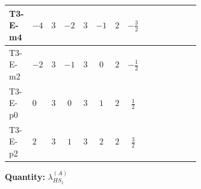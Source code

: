 \documentclass[8pt]{article}
\begin{document}
\begin{landscape}
\begin{longtable}{@{}llcccccc >{\raggedright\arraybackslash}p{0.21\linewidth} >{\raggedright\arraybackslash}p{0.21\linewidth} >{\raggedright\arraybackslash}p{0.21\linewidth}@{}}
\midrule
T3-E-m4 & $-4$ & $3$ & $-2$ & $3$ & $-1$ & $2$ & $-\frac{3}{2}$ & \scriptsize\adjustbox{max width=\linewidth}{$\begin{gathered} +2 {\lambda_1} {\lambda_{HS_1}^{(A)}}\end{gathered}$} & \scriptsize\adjustbox{max width=\linewidth}{$\begin{gathered} +8 {\lambda_{HS_1}^{(1)}} {\lambda_{HS_1}^{(A)}}\end{gathered}$} & \scriptsize\adjustbox{max width=\linewidth}{$\begin{gathered} +2 {\lambda_{HS_1}^{(A)}} {\lambda_{S_1}^{(1)}}\end{gathered}$} \\
\midrule
T3-E-m2 & $-2$ & $3$ & $-1$ & $3$ & $0$ & $2$ & $-\frac{1}{2}$ & \scriptsize\adjustbox{max width=\linewidth}{$\begin{gathered} +2 {\lambda_1} {\lambda_{HS_1}^{(A)}}\end{gathered}$} & \scriptsize\adjustbox{max width=\linewidth}{$\begin{gathered} +8 {\lambda_{HS_1}^{(1)}} {\lambda_{HS_1}^{(A)}}\end{gathered}$} & \scriptsize\adjustbox{max width=\linewidth}{$\begin{gathered} +2 {\lambda_{HS_1}^{(A)}} {\lambda_{S_1}^{(1)}}\end{gathered}$} \\
\midrule
T3-E-p0 & $0$ & $3$ & $0$ & $3$ & $1$ & $2$ & $\frac{1}{2}$ & \scriptsize\adjustbox{max width=\linewidth}{$\begin{gathered} +2 {\lambda_1} {\lambda_{HS_1}^{(A)}}\end{gathered}$} & \scriptsize\adjustbox{max width=\linewidth}{$\begin{gathered} +8 {\lambda_{HS_1}^{(1)}} {\lambda_{HS_1}^{(A)}}\end{gathered}$} & \scriptsize\adjustbox{max width=\linewidth}{$\begin{gathered} +2 {\lambda_{HS_1}^{(A)}} {\lambda_{S_1}^{(1)}}\end{gathered}$} \\
\midrule
T3-E-p2 & $2$ & $3$ & $1$ & $3$ & $2$ & $2$ & $\frac{3}{2}$ & \scriptsize\adjustbox{max width=\linewidth}{$\begin{gathered} +2 {\lambda_1} {\lambda_{HS_1}^{(A)}}\end{gathered}$} & \scriptsize\adjustbox{max width=\linewidth}{$\begin{gathered} +8 {\lambda_{HS_1}^{(1)}} {\lambda_{HS_1}^{(A)}}\end{gathered}$} & \scriptsize\adjustbox{max width=\linewidth}{$\begin{gathered} +2 {\lambda_{HS_1}^{(A)}} {\lambda_{S_1}^{(1)}}\end{gathered}$} \\
\midrule
\bottomrule
\end{longtable}
\clearpage
\noindent\textbf{Quantity: }$\lambda_{HS_1}^{(A)}$\par\smallskip

\end{landscape}
\end{document}

